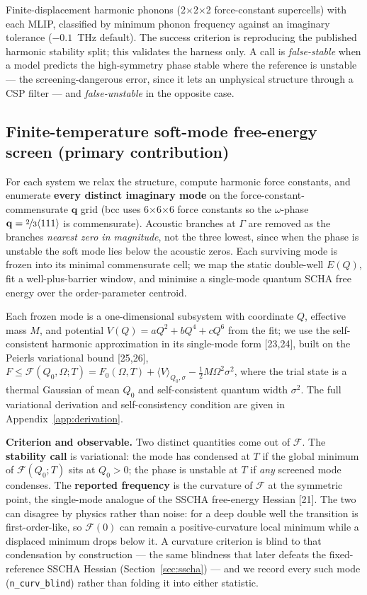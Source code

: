 \documentclass{article}
\begin{document}
Finite-displacement harmonic phonons (2$\times$2$\times$2 force-constant supercells) with each MLIP, classified by minimum phonon frequency against an imaginary tolerance ($-0.1$~THz default). The success criterion is reproducing the published harmonic stability split; this validates the harness only. A call is \emph{false-stable} when a model predicts the high-symmetry phase stable where the reference is unstable --- the screening-dangerous error, since it lets an unphysical structure through a CSP filter --- and \emph{false-unstable} in the opposite case.

\subsection{Finite-temperature soft-mode free-energy screen (primary contribution)}
\label{sec:screen}

For each system we relax the structure, compute harmonic force constants, and enumerate \textbf{every distinct imaginary mode} on the force-constant-commensurate $\mathbf{q}$ grid (bcc uses 6$\times$6$\times$6 force constants so the $\omega$-phase $\mathbf{q}=\nicefrac{2}{3}\langle111\rangle$ is commensurate). Acoustic branches at $\Gamma$ are removed as the branches \emph{nearest zero in magnitude}, not the three lowest, since when the phase is unstable the soft mode lies below the acoustic zeros. Each surviving mode is frozen into its minimal commensurate cell; we map the static double-well $E(Q)$, fit a well-plus-barrier window, and minimise a single-mode quantum SCHA free energy over the order-parameter centroid.

Each frozen mode is a one-dimensional subsystem with coordinate $Q$, effective mass $M$, and potential $V(Q)=aQ^2+bQ^4+cQ^6$ from the fit; we use the self-consistent harmonic approximation in its single-mode form [23,24], built on the Peierls variational bound [25,26], $F\le\mathcal{F}(Q_0,\Omega;T)=F_0(\Omega,T)+\langle V\rangle_{Q_0,\sigma}-\tfrac12 M\Omega^2\sigma^2$, where the trial state is a thermal Gaussian of mean $Q_0$ and self-consistent quantum width $\sigma^2$. The full variational derivation and self-consistency condition are given in Appendix~\ref{app:derivation}.

\textbf{Criterion and observable.} Two distinct quantities come out of $\mathcal{F}$. The \textbf{stability call} is variational: the mode has condensed at $T$ if the global minimum of $\mathcal{F}(Q_0;T)$ sits at $Q_0>0$; the phase is unstable at $T$ if \emph{any} screened mode condenses. The \textbf{reported frequency} is the curvature of $\mathcal{F}$ at the symmetric point, the single-mode analogue of the SSCHA free-energy Hessian [21]. The two can disagree by physics rather than noise: for a deep double well the transition is first-order-like, so $\mathcal{F}(0)$ can remain a positive-curvature local minimum while a displaced minimum drops below it. A curvature criterion is blind to that condensation by construction --- the same blindness that later defeats the fixed-reference SSCHA Hessian (Section~\ref{sec:sscha}) --- and we record every such mode (\texttt{n\_curv\_blind}) rather than folding it into either statistic.
\end{document}
